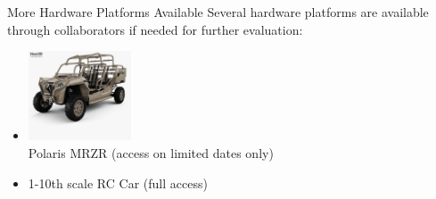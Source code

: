 \documentclass[slidestop,aspectratio=169]{beamer}
\theoremstyle{plain}
\theoremstyle{definition}
\theoremstyle{remark}
\begin{document}
\begin{frame}[t]{More Hardware Platforms Available}
Several hardware platforms are available through collaborators if needed for further evaluation:
\begin{itemize}
\item\includegraphics[width=1.2in]{img/mrzr.jpg}\\
Polaris MRZR (access on limited dates only)
\item 1-10th scale RC Car (full access)
\end{itemize}

\end{frame}
\end{document}

